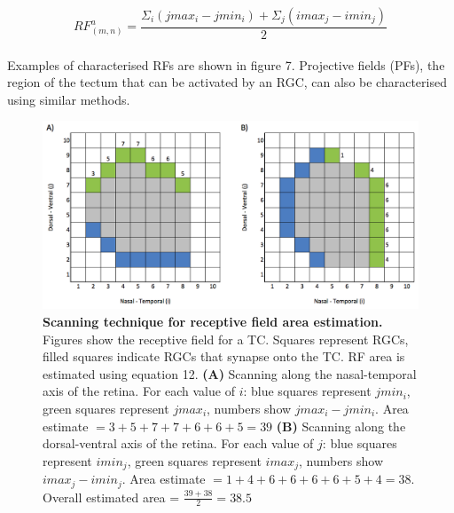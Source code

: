 \documentclass[11pt]{"article"}
\begin{document}
\begin{equation}
RF^a_{(m,n)} = \frac{\Sigma_i (jmax_i - jmin_i) + \Sigma_j (imax_j - imin_j)}{2}
\end{equation}\\

Examples of characterised RFs are shown in figure 7. Projective fields (PFs), the region of the tectum that can be activated by an RGC, can also be characterised using similar methods.\\

\pagebreak

\begin{figure}[!h]
\includegraphics[scale=0.43]{AreaMethod}
\caption{\textbf{Scanning technique for receptive field area estimation.} Figures show the receptive field for a TC. Squares represent RGCs, filled squares indicate RGCs that synapse onto the TC. RF area is estimated using equation 12. 
\textbf{(A)} Scanning along the nasal-temporal axis of the retina. For each value of $i$: blue squares represent $jmin_i$, green squares represent $jmax_i$, numbers show $jmax_i - jmin_i$. Area estimate $= 3+5+7+7+6+6+5 = 39$
\textbf{(B)} Scanning along the dorsal-ventral axis of the retina. For each value of $j$: blue squares represent $imin_j$, green squares represent $imax_j$, numbers show $imax_j - imin_j$. Area estimate $= 1+4+6+6+6+6+5+4 = 38$.
Overall estimated area = $\frac{39 + 38}{2} = 38.5$
}
\end{figure}

\pagebreak
\end{document}
